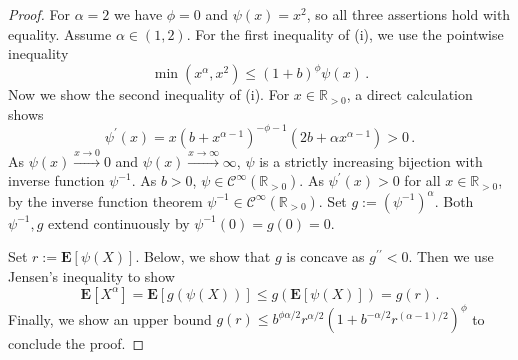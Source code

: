 \documentclass{article}
\newcommand*{\mc}[1]{\mathcal{#1}}
\newcommand{\R}{\mathbb{R}}
\newcommand{\Rpp}{\R_{>0}}
\newcommand{\lab}{\left[} %
\newcommand{\rab}{\right]} %
\newcommand{\ab}[1]{\lab #1 \rab} %
\newcommand{\abOf}[1]{\!\ab{#1}} %
\newcommand{\lb}{\left(} %
\newcommand{\rb}{\right)} %
\newcommand{\br}[1]{\lb #1 \rb} %
\newcommand{\brOf}[1]{\!\br{#1}} %
\newcommand{\E}{\mathbf{E}} %
\newcommand{\Eof}[1]{\E[#1]}
\newcommand{\EOf}[1]{\E\abOf{#1}}
\newcommand{\pr}{^\prime}
\newcommand{\prr}{^{\prime\prime}}
\newcommand{\eqfs}{\,.}
\begin{document}
\begin{proof}
    For $\alpha = 2$ we have $\phi = 0$ and $\psi(x) = x^2$, so all three
    assertions hold with equality. Assume $\alpha\in(1,2)$.
    For the first inequality of (i), we use the pointwise inequality
    \begin{equation}
        \min\brOf{x^\alpha, x^2} \leq (1+b)^\phi \psi(x)
        \eqfs
    \end{equation}
    Now we show the second inequality of (i). For $x\in\Rpp$, a direct calculation shows
    \begin{equation}
        \psi\pr(x) = x(b+x^{\alpha-1})^{-\phi-1}\br{2b+\alpha x^{\alpha-1}}>0\eqfs
    \end{equation}
    As $\psi(x) \xrightarrow{x\to0} 0$ and $\psi(x) \xrightarrow{x\to\infty} \infty$, $\psi$ is a strictly increasing bijection with inverse function $\psi^{-1}$. As $b > 0$, $\psi \in \mc C^\infty(\Rpp)$. As $\psi\pr(x)>0$ for all $x\in\Rpp$, by the inverse function theorem $\psi^{-1} \in \mc C^\infty(\Rpp)$. Set $g:=(\psi^{-1})^\alpha$. Both $\psi^{-1},g$ extend continuously by $\psi^{-1}(0)=g(0)=0$.
    
    Set $r := \Eof{\psi(X)}$.
    Below, we show that $g$ is concave as $g\prr < 0$. Then we use Jensen's inequality to show
    \begin{equation}
        \EOf{X^\alpha} = \EOf{g(\psi(X))} \leq g(\EOf{\psi(X)}) = g(r)
        \eqfs 
    \end{equation}
    Finally, we show an upper bound $g(r) \leq b^{\phi\alpha/2} r^{\alpha/2} \br{1+b^{-\alpha/2}r^{(\alpha-1)/2}}^{\phi}$ to conclude the proof.
    

\end{proof}
\end{document}
